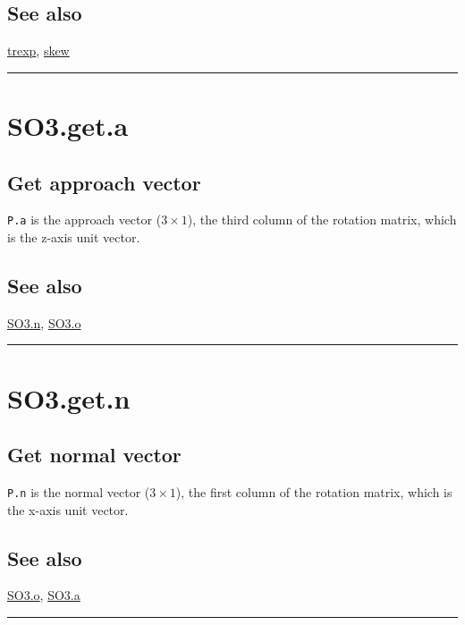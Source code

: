 \subsection*{See also}


\hyperlink{trexp}{\color{blue} trexp}, \hyperlink{skew}{\color{blue} skew}

\vspace{1.5ex}\hrule

\hypertarget{SO3.get.a}{\section*{SO3.get.a}}
\subsection*{Get approach vector}


\texttt{P.a} is the approach vector ($3 \times 1$), the third column of the rotation matrix,
which is the z-axis unit vector.


\subsection*{See also}


\hyperlink{SO3.n}{\color{blue} SO3.n}, \hyperlink{SO3.o}{\color{blue} SO3.o}

\vspace{1.5ex}\hrule

\hypertarget{SO3.get.n}{\section*{SO3.get.n}}
\subsection*{Get normal vector}


\texttt{P.n} is the normal vector ($3 \times 1$), the first column of the rotation matrix,
which is the x-axis unit vector.


\subsection*{See also}


\hyperlink{SO3.o}{\color{blue} SO3.o}, \hyperlink{SO3.a}{\color{blue} SO3.a}

\vspace{1.5ex}\hrule

